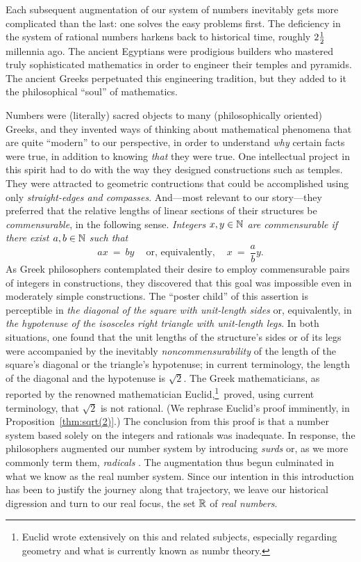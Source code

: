 Each subsequent augmentation of our system of numbers inevitably gets
more complicated than the last: one solves the easy problems first.
The deficiency in the system of rational numbers harkens back to
historical time, roughly $2 {1 \over 2}$ millennia ago.  The ancient
Egyptians were prodigious builders who mastered truly sophisticated
mathematics in order to engineer their temples and pyramids.  The
ancient Greeks perpetuated this engineering tradition, but they added
to it the philosophical ``soul'' of mathematics.

Numbers were (literally) sacred objects to many (philosophically
oriented) Greeks, and they invented ways of thinking about
mathematical phenomena that are quite ``modern'' to our perspective,
in order to understand {\em why} certain facts were true, in addition
to knowing {\em that} they were true.  One intellectual project in
this spirit had to do with the way they designed constructions such as
temples.  They were attracted to geometric contructions that could be
accomplished using only {\em straight-edges and compasses}.
And---most relevant to our story---they preferred that the relative
lengths of linear sections of their structures be {\em commensurable},
 in the
following sense.  {\em Integers $x,y \in \mathbb{N}$ are {\em commensurable}
  if there exist $a, b \in \mathbb{N}$ such that}
\[ 
ax \ = \ by \ \ \ \ \mbox{ or, equivalently, } \ \ \ \ x \ = \ \frac{a}{b} y.
\]
As Greek philosophers contemplated their desire to employ
commensurable pairs of integers in constructions, they discovered that
this goal was impossible even in moderately simple constructions.  The
``poster child'' of this assertion is perceptible in {\it the diagonal
  of the square with unit-length sides} or, equivalently, in {\it the
  hypotenuse of the isosceles right triangle with unit-length legs}.
In both situations, one found that the unit lengths of the structure's
sides or of its legs were accompanied by the inevitably {\em
  noncommensurability} of the length of the square's diagonal or the
triangle's hypotenuse; in current terminology, the length of the
diagonal and the hypotenuse is $\sqrt{2}$.  The Greek mathematicians,
as reported by the renowned mathematician
Euclid,\footnote{Euclid wrote extensively on this and related
  subjects, especially regarding geometry and what is currently known
  as numbr theory.}~proved, using current terminology, that $\sqrt{2}$
is not rational.  (We rephrase Euclid's proof imminently, in
Proposition~\ref{thm:sqrt(2)}.)  The conclusion from this proof is
that a number system based solely on the integers and rationals was
inadequate.  In response, the philosophers augmented our number system
by introducing {\it surds}  or, as we more commonly
term them, {\it radicals} .  The augmentation
thus begun culminated in what we know as the real number system.
Since our intention in this introduction has been to justify the
journey along that trajectory, we leave our historical digression and
turn to our real focus, the set $\mathbb{R}$ of {\it real
  numbers}.

